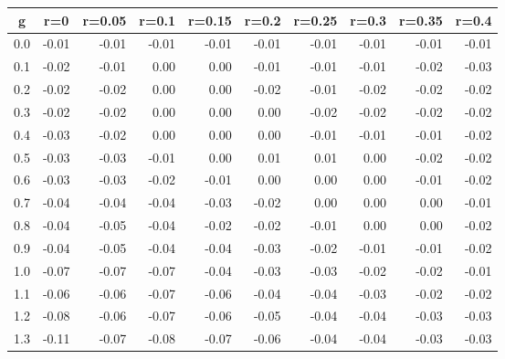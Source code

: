 %
\begin{table}[!tbp]
 \begin{center}
 \begin{tabular}{rrrrrrrrrr}\hline\hline
\multicolumn{1}{c}{g}&\multicolumn{1}{c}{r=0}&\multicolumn{1}{c}{r=0.05}&\multicolumn{1}{c}{r=0.1}&\multicolumn{1}{c}{r=0.15}&\multicolumn{1}{c}{r=0.2}&\multicolumn{1}{c}{r=0.25}&\multicolumn{1}{c}{r=0.3}&\multicolumn{1}{c}{r=0.35}&\multicolumn{1}{c}{r=0.4}\tabularnewline
\hline
0.0&-0.01&-0.01&-0.01&-0.01&-0.01&-0.01&-0.01&-0.01&-0.01\tabularnewline
0.1&-0.02&-0.01& 0.00& 0.00&-0.01&-0.01&-0.01&-0.02&-0.03\tabularnewline
0.2&-0.02&-0.02& 0.00& 0.00&-0.02&-0.01&-0.02&-0.02&-0.02\tabularnewline
0.3&-0.02&-0.02& 0.00& 0.00& 0.00&-0.02&-0.02&-0.02&-0.02\tabularnewline
0.4&-0.03&-0.02& 0.00& 0.00& 0.00&-0.01&-0.01&-0.01&-0.02\tabularnewline
0.5&-0.03&-0.03&-0.01& 0.00& 0.01& 0.01& 0.00&-0.02&-0.02\tabularnewline
0.6&-0.03&-0.03&-0.02&-0.01& 0.00& 0.00& 0.00&-0.01&-0.02\tabularnewline
0.7&-0.04&-0.04&-0.04&-0.03&-0.02& 0.00& 0.00& 0.00&-0.01\tabularnewline
0.8&-0.04&-0.05&-0.04&-0.02&-0.02&-0.01& 0.00& 0.00&-0.02\tabularnewline
0.9&-0.04&-0.05&-0.04&-0.04&-0.03&-0.02&-0.01&-0.01&-0.02\tabularnewline
1.0&-0.07&-0.07&-0.07&-0.04&-0.03&-0.03&-0.02&-0.02&-0.01\tabularnewline
1.1&-0.06&-0.06&-0.07&-0.06&-0.04&-0.04&-0.03&-0.02&-0.02\tabularnewline
1.2&-0.08&-0.06&-0.07&-0.06&-0.05&-0.04&-0.04&-0.03&-0.03\tabularnewline
1.3&-0.11&-0.07&-0.08&-0.07&-0.06&-0.04&-0.04&-0.03&-0.03\tabularnewline
\hline
\end{tabular}

\end{center}

\end{table}

